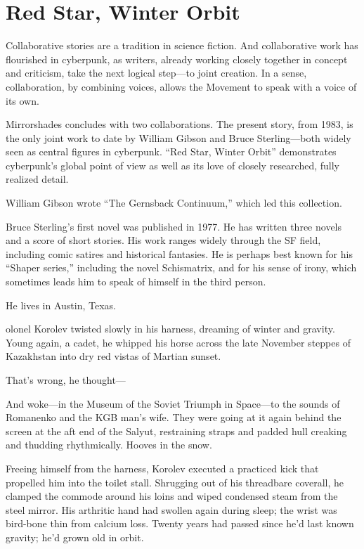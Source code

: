 \chapter{Red Star, Winter Orbit}

Collaborative stories are a tradition in science fiction. And collaborative work has flourished in cyberpunk, as writers, already working closely together in concept and criticism, take the next logical step---to joint creation. In a sense, collaboration, by combining voices, allows the Movement to speak with a voice of its own.

Mirrorshades concludes with two collaborations. The present story, from 1983, is the only joint work to date by William Gibson and Bruce Sterling---both widely seen as central figures in cyberpunk. ``Red Star, Winter Orbit'' demonstrates cyberpunk's global point of view as well as its love of closely researched, fully realized detail.

William Gibson wrote ``The Gernsback Continuum,'' which led this collection.

Bruce Sterling's first novel was published in 1977. He has written three novels and a score of short stories. His work ranges widely through the SF field, including comic satires and historical fantasies. He is perhaps best known for his ``Shaper series,'' including the novel Schismatrix, and for his sense of irony, which sometimes leads him to speak of himself in the third person.

He lives in Austin, Texas.

\hrulefill

olonel Korolev twisted slowly in his harness, dreaming of winter and gravity. Young again, a cadet, he whipped his horse across the late November steppes of Kazakhstan into dry red vistas of Martian sunset.

That's wrong, he thought---

And woke---in the Museum of the Soviet Triumph in Space---to the sounds of Romanenko and the KGB man's wife. They were going at it again behind the screen at the aft end of the Salyut, restraining straps and padded hull creaking and thudding rhythmically. Hooves in the snow.

Freeing himself from the harness, Korolev executed a practiced kick that propelled him into the toilet stall. Shrugging out of his threadbare coverall, he clamped the commode around his loins and wiped condensed steam from the steel mirror. His arthritic hand had swollen again during sleep; the wrist was bird-bone thin from calcium loss. Twenty years had passed since he'd last known gravity; he'd grown old in orbit.


